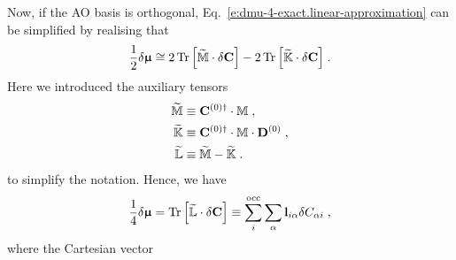 \documentclass[aip,amsmath,amssymb,reprint,floatfix]{revtex4-1}
\newcommand{\BM}[1]{\bm{#1}}
\DeclareMathOperator{\Tr}{Tr}
\begin{document}
Now, if the AO basis is orthogonal, Eq.~\eqref{e:dmu-4-exact.linear-approximation} can be simplified by realising that
%
\begin{equation}
 \frac{1}{2} 
 \delta {\BM{\upmu}}
  \cong
2 \Tr{ 
    \left[ 
         \widetilde{\mathbb{M}} \cdot \delta {\bf C}
   \right] }  
-
2 \Tr{ 
    \left[ 
         \widetilde{\mathbb{K}} \cdot \delta {\bf C}
   \right] } \;.
\end{equation}
%
Here we introduced the auxiliary tensors
%
\begin{subequations}
 \begin{align}
   \widetilde{\mathbb{M}}  &\equiv {\bf C}^{(0)\dagger} \cdot {\mathbb{M}}     \;,           \\
   \widetilde{\mathbb{K}}  &\equiv {\bf C}^{(0)\dagger} \cdot {\mathbb{M}} \cdot {\bf D}^{(0)} \;, \\
   \widetilde{\mathbb{L}}  &\equiv \widetilde{\mathbb{M}} - \widetilde{\mathbb{K}} \;.
 \end{align}
\end{subequations}
%
to simplify the notation. Hence, we have
%
\begin{equation} \label{e:dmu-l-vector}
  \frac{1}{4} 
 \delta {\BM{\upmu}} %
   =
   \Tr{ 
    \left[ 
         \widetilde{\mathbb{L}} \cdot \delta {\bf C}
    \right] }
   \equiv \sum_{i}^{\rm occ} \sum_\alpha {\bf l}_{i\alpha} \delta C_{\alpha i} \;,
\end{equation}
%
where the Cartesian vector
\end{document}

